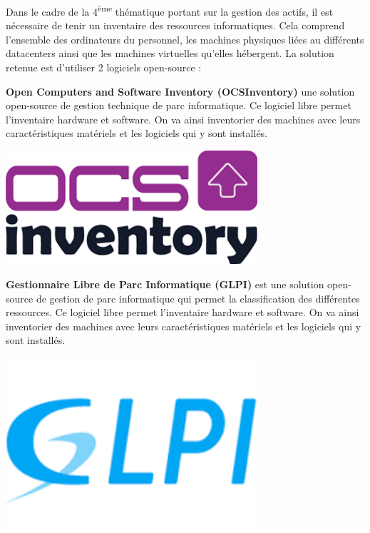\documentclass[12pt]{article}
\begin{document}
Dans le cadre de la 4\textsuperscript{ème} thématique portant sur la gestion des actifs, il est nécessaire de tenir un inventaire des ressources informatiques. 
Cela comprend l'ensemble des ordinateurs du personnel, les machines physiques liées au différents datacenters ainsi que les machines virtuelles qu'elles hébergent.
La solution retenue est d'utiliser 2 logiciels open-source :

\noindent%
\begin{minipage}{.7\textwidth}%
\textbf{Open Computers and Software Inventory (OCSInventory)} une solution open-source de gestion technique de parc informatique. 
Ce logiciel libre permet l’inventaire hardware et software. 
On va ainsi inventorier des machines avec leurs caractéristiques matériels et les logiciels qui y sont installés.
\end{minipage}%
\hfill
\begin{minipage}{.3\textwidth}%
\begin{center}
\includegraphics[width=0.7\textwidth]{src/logo_ocsinventory.png}
\end{center}
\end{minipage}%

\noindent%
\begin{minipage}{.7\textwidth}%
\textbf{Gestionnaire Libre de Parc Informatique (GLPI)} est une solution open-source de gestion de parc informatique qui permet la classification des différentes ressources. 
Ce logiciel libre permet l’inventaire hardware et software. 
On va ainsi inventorier des machines avec leurs caractéristiques matériels et les logiciels qui y sont installés.
\end{minipage}%
\hfill
\begin{minipage}{.3\textwidth}%
\begin{center}
\includegraphics[width=0.7\textwidth]{src/logo_glpi.png}
\end{center}
\end{minipage}%
\end{document}
